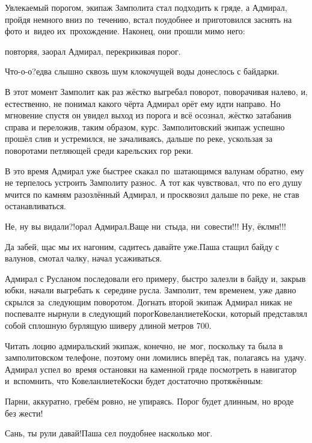 Увлекаемый порогом, экипаж Замполита стал подходить к гряде, а Адмирал, пройдя немного вниз по~течению, встал поудобнее и приготовился заснять на фото и~видео их~прохождение. Наконец, они прошли мимо него:

\mdash повторяя, заорал Адмирал, перекрикивая порог.

\diagdash Что-о-о?\mdash едва слышно сквозь шум клокочущей воды донеслось с байдарки.


В этот момент Замполит как раз жёстко выгребал поворот, поворачивая налево, и, естественно, не понимал какого чёрта Адмирал орёт ему идти направо. Но мгновение спустя он увидел выход из порога и всё осознал, жёстко затабанив справа и переложив, таким образом, курс. Замполитовский экипаж успешно прошёл слив и устремился, не зачаливаясь, дальше по реке, ускользая за поворотами петляющей среди карельских гор реки.  

В это время Адмирал уже быстрее скакал по~шатающимся валунам обратно, ему не терпелось устроить Замполиту разнос. А тот как чувствовал, что по его душу мчится по камням разозлённый Адмирал, и просквозил дальше по реке, не став останавливаться.

\diagdash Не, ну вы видали?!\mdash орал Адмирал.\mdash Ваще ни~стыда, ни~совести!!! Ну, ёклмн!!!

\diagdash Да забей, щас мы их нагоним, садитесь давайте уже.\mdash Паша стащил байду с валунов, смотал чалку, начал усаживаться. 

Адмирал с Русланом последовали его примеру, быстро залезли в байду и, закрыв юбки, начали выгребать к~середине русла. Замполит, тем временем, уже давно скрылся за~следующим поворотом. Догнать второй экипаж Адмирал никак не поспевал\mdash те нырнули в следующий порог\mdash Ковеланлиете\sdash Коски, который представлял собой сплошную бурлящую шиверу длиной метров 700.

Читать лоцию адмиральский экипаж, конечно, не~мог, поскольку та была в замполитовском телефоне, поэтому они ломились вперёд так, полагаясь на~удачу. Адмирал успел во~время остановки на каменной гряде посмотреть в навигатор и~вспомнить, что Ковеланлиете\sdash Коски будет достаточно протяжённым:

\diagdash Парни, аккуратно, гребём ровно, не упираясь. Порог будет длинным, но вроде без жести!

\diagdash Сань, ты рули давай!\mdash Паша сел поудобнее насколько мог.

